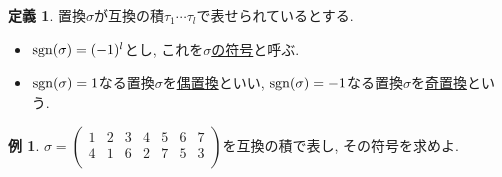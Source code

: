 \documentclass[dvipdfmx,a4paper,11pt]{article}
\newcommand{\sgn}{{\rm sgn}}
\theoremstyle{definition}
\newtheorem{dfn}[thm]{定義}
\newtheorem{exa}[thm]{例}
\begin{document}
 \begin{tcolorbox}[
    colback = white,
    colframe = green!35!black,
    fonttitle = \bfseries,
    breakable = true]
    \begin{dfn}
置換$\sigma$が互換の積$\tau_1 \cdots \tau_{l}$で表せられているとする.
\begin{itemize}
\item $\sgn (\sigma) = (-1)^{l}$とし, これを\underline{$\sigma$の符号}と呼ぶ.
\item $\sgn (\sigma) = 1$なる置換$\sigma$を\underline{偶置換}といい, $\sgn (\sigma) = -1$なる置換$\sigma$を\underline{奇置換}という.
\end{itemize}
  \end{dfn}
 \end{tcolorbox}
 
 \begin{exa}
 $
 \sigma 
  =
 \begin{pmatrix}
 1& 2  &3 & 4 & 5 & 6 & 7\\
 4& 1  &6  &2 &7 & 5 & 3\\
 \end{pmatrix} 
 $を互換の積で表し, その符号を求めよ.
 

\end{exa}
\end{document}
